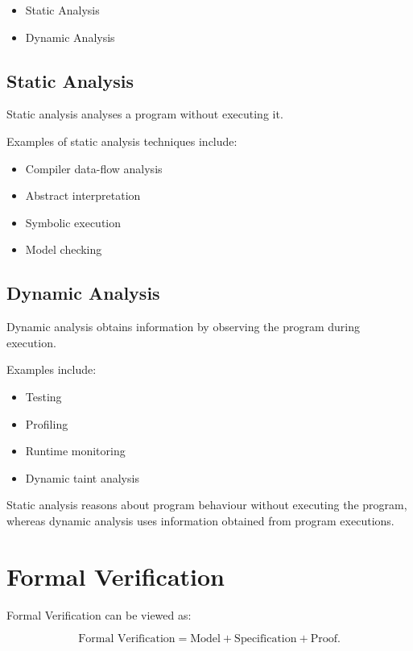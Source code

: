 \begin{itemize}
    \item Static Analysis
    \item Dynamic Analysis
\end{itemize}


\subsection{Static Analysis}

Static analysis analyses a program without executing it.

Examples of static analysis techniques include:

\begin{itemize}
    \item Compiler data-flow analysis
    \item Abstract interpretation
    \item Symbolic execution
    \item Model checking
\end{itemize}


\subsection{Dynamic Analysis}

Dynamic analysis obtains information by observing the program during
execution.

Examples include:

\begin{itemize}
    \item Testing
    \item Profiling
    \item Runtime monitoring
    \item Dynamic taint analysis
\end{itemize}

\begin{ppnote}
Static analysis reasons about program behaviour without executing the
program, whereas dynamic analysis uses information obtained from
program executions.
\end{ppnote}


\section{Formal Verification}

Formal Verification can be viewed as:

\[
\text{Formal Verification}
=
\text{Model} + \text{Specification} + \text{Proof}.
\]

